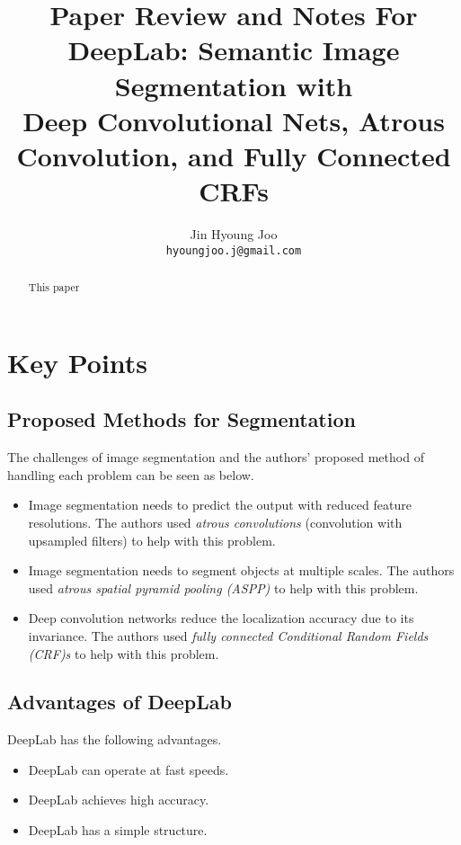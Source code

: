 \documentclass[10pt,twocolumn,letterpaper]{article}
\begin{document}
\title{Paper Review and Notes For\\DeepLab: Semantic Image Segmentation with\\Deep Convolutional Nets, Atrous Convolution, and Fully Connected CRFs}

\author{Jin Hyoung Joo\\ {\tt\small hyoungjoo.j@gmail.com} }
\maketitle

\begin{abstract}
    This paper \cite{DeepLab}
\end{abstract}

\section{Key Points}
\subsection{Proposed Methods for Segmentation}
The challenges of image segmentation and the authors' proposed method of handling
each problem can be seen as below.
\begin{itemize}
    \item{
        Image segmentation needs to predict the output with reduced feature resolutions.
        The authors used \emph{atrous convolutions} (convolution with upsampled filters)
        to help with this problem.
    }
    \item{
        Image segmentation needs to segment objects at multiple scales. The authors used
        \emph{atrous spatial pyramid pooling (ASPP)} to help with this problem.
    }
    \item{
        Deep convolution networks reduce the localization accuracy due to its invariance.
        The authors used \emph{fully connected Conditional Random Fields (CRF)s} to help
        with this problem.
    }
\end{itemize}

\subsection{Advantages of DeepLab}
DeepLab has the following advantages.
\begin{itemize}
    \item{DeepLab can operate at fast speeds.}
    \item{DeepLab achieves high accuracy.}
    \item{DeepLab has a simple structure.}
\end{itemize}
\end{document}

